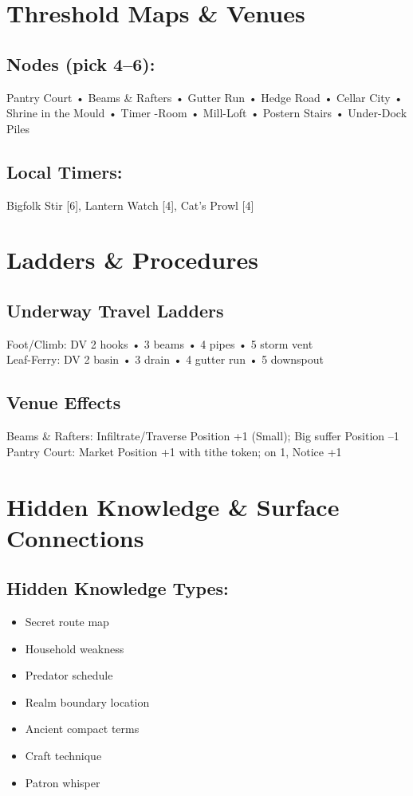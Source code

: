 \documentclass[11pt,letterpaper]{article}
\begin{document}
\section{Threshold Maps \& Venues}

\subsection*{Nodes (pick 4--6):}
Pantry Court • Beams \& Rafters • Gutter Run • Hedge Road • Cellar City • Shrine in the Mould • Timer -Room • Mill-Loft • Postern Stairs • Under-Dock Piles

\subsection*{Local Timers:}
Bigfolk Stir [6], Lantern Watch [4], Cat's Prowl [4]

\section{Ladders \& Procedures}

\subsection*{Underway Travel Ladders}
Foot/Climb: DV 2 hooks • 3 beams • 4 pipes • 5 storm vent \\
Leaf-Ferry: DV 2 basin • 3 drain • 4 gutter run • 5 downspout

\subsection*{Venue Effects}
Beams \& Rafters: Infiltrate/Traverse Position +1 (Small); Big suffer Position --1 \\
Pantry Court: Market Position +1 with tithe token; on 1, Notice +1

\section{Hidden Knowledge \& Surface Connections}

\subsection*{Hidden Knowledge Types:}
\begin{itemize}[leftmargin=*]
\item Secret route map
\item Household weakness
\item Predator schedule
\item Realm boundary location
\item Ancient compact terms
\item Craft technique
\item Patron whisper
\end{itemize}
\end{document}
